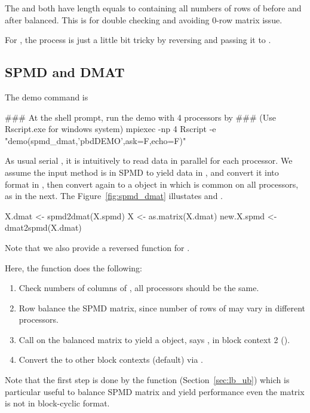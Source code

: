 The  and  both have length equals to
 containing all numbers of rows of 
before and after balanced. This is for double checking and avoiding 0-row
matrix issue.

For , the process is just a little bit tricky by reversing
 and passing it to .




\subsection[Convert SPMD and DMAT]{SPMD and DMAT}
\label{sec:spmd_dmat}

The demo command is
\begin{Command}
### At the shell prompt, run the demo with 4 processors by
### (Use Rscript.exe for windows system)
mpiexec -np 4 Rscript -e "demo(spmd_dmat,'pbdDEMO',ask=F,echo=F)"
\end{Command}

As usual serial , it is intuitively to read data in parallel
for each processor. We assume the input method is in SPMD to yield
data in , and convert it into 
format in , then convert again to a 
object in  which is common on all processors, as in the next.
The Figure~\ref{fig:spmd_dmat} illustates  and .
\begin{Code}[title=R Code]
X.dmat <- spmd2dmat(X.spmd)
X <- as.matrix(X.dmat)
new.X.spmd <- dmat2spmd(X.dmat)
\end{Code}
Note that we also provide a reversed function  for
.

Here, the  function does the following:
\begin{enumerate}
\item Check numbers of columns of , all
      processors should be the same.
\item Row balance the SPMD matrix, since number of rows of
       may vary in different processors.
\item Call  on the balanced matrix to yield a  object,
      says , in block context 2 ().
\item Convert the  to other block contexts
      (default) via .
\end{enumerate}
Note that the first step is done by the  function
(Section~\ref{sec:lb_ub})
which is particular useful to balance SPMD matrix and yield performance
even the matrix is not in block-cyclic format.

